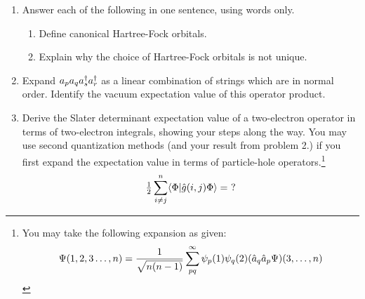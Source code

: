 \documentclass[11pt]{article}
\numberwithin{equation}{section}
\begin{document}
\begin{enumerate}
\item
  Answer each of the following in one sentence, using words only.
  \begin{enumerate}
  \item
    Define canonical Hartree-Fock orbitals.
    \vspace{2cm}
  \item
    Explain why the choice of Hartree-Fock orbitals is not unique.
    \vspace{2cm}
  \end{enumerate}

\item
  Expand $a_pa_qa_s^\dagger a_r^\dagger$ as a linear combination of strings which are in normal order.
  Identify the vacuum expectation value of this operator product.
  \vspace{11cm}

\item
  Derive the Slater determinant expectation value of a two-electron operator in terms of two-electron integrals, showing your steps along the way.
  You may use second quantization methods (and your result from problem 2.) if you first expand the expectation value in terms of particle-hole operators.\footnote{
  You may take the following expansion as given:
  \begin{align*}
    \Psi (1,2,3\ldots,n)
  =
    \frac {1}{\sqrt{n(n-1)}}
    \sum_{pq}^\infty
    \psi _p(1)
    \psi _q(2)
    (\hat{a}_q\hat{a}_p\Psi )(3,\ldots,n)
  \end{align*}
  }
  \begin{align*}
    \tfrac{1}{2}
    \sum_{i\neq j}^n
    \langle\Phi |\hat{g}(i,j)\Phi \rangle
  =
    \,\,?
  \end{align*}
\end{enumerate}
\end{document}
